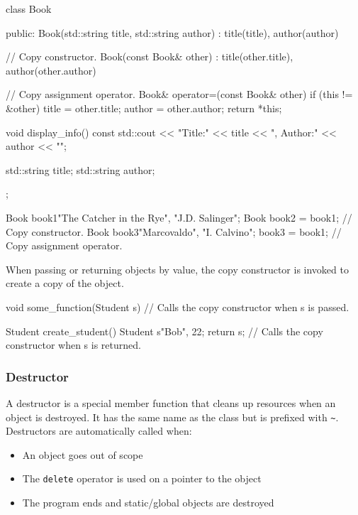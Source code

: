 \vspace{-0.3em}

\begin{codeblock}[language=C++, numbers=none]
class Book {
public:
    Book(std::string title, std::string author) 
        : title(title), author(author) {}

    // Copy constructor.
    Book(const Book& other)
        : title(other.title), author(other.author) {}

    // Copy assignment operator.
    Book& operator=(const Book& other) {
        if (this != &other) {
            title = other.title;
            author = other.author;
        }
        return *this;
    }

    void display_info() const {
        std::cout << "Title:" << title << ", Author:" << author << "\n";
    }

    std::string title;
    std::string author;
};

Book book1{"The Catcher in the Rye", "J.D. Salinger"};
Book book2 = book1; // Copy constructor.
Book book3{"Marcovaldo", "I. Calvino"};
book3 = book1; // Copy assignment operator.
\end{codeblock}

\begin{observationblock}
    When passing or returning objects by value, the copy constructor is invoked to create a copy of the object.

\begin{codeblock}[language=C++]
void some_function(Student s) {
    // Calls the copy constructor when s is passed.
}

Student create_student() {
    Student s{"Bob", 22};
    return s; // Calls the copy constructor when s is returned.
}
\end{codeblock}
\end{observationblock}

\subsubsection{Destructor}

\vspace{-0.2em}

A destructor is a special member function that cleans up resources when an object is destroyed. It has the same name as the class but is prefixed with \texttt{\textasciitilde}. Destructors are automatically called when:
\begin{itemize}
    \item An object goes out of scope
    \item The \texttt{delete} operator is used on a pointer to the object
    \item The program ends and static/global objects are destroyed
\end{itemize}

